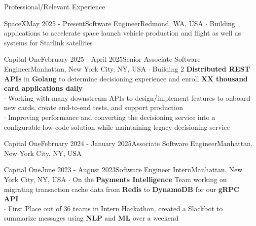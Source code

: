 \documentclass[UTF8]{resume} %
\begin{document}
\begin{rSection}{Professional/Relevant Experience}
    \begin{rSubsection}{SpaceX}{May 2025 - Present}{Software Engineer}{Redmond, WA, USA}
        $\cdot$ Building applications to accelerate space launch vehicle production and flight as well as systems for Starlink satellites
     \end{rSubsection}
\begin{rSubsection}{Capital One}{February 2025 - April 2025}{Senior Associate Software Engineer}{Manhattan, New York City, NY, USA}
   $\cdot$ Building 2 \textbf{Distributed REST APIs} in \textbf{Golang} to determine decisioning experience and enroll \textbf{XX thousand card applications daily} \\
   $\cdot$ Working with many downstream APIs to design/implement features to onboard new cards, create end-to-end tests, and support production \\ 
   $\cdot$ Improving performance and converting the decisioning service into a configurable low-code solution while maintaining legacy decisioning service
\end{rSubsection}
\begin{rSubsection}{Capital One}{February 2024 - January 2025}{Associate Software Engineer}{Manhattan, New York City, NY, USA}
\end{rSubsection}
\begin{rSubsection}{Capital One}{June 2023 - August 2023}{Software Engineer Intern}{Manhattan, New York City, NY, USA}
    $\cdot$ On the \textbf{Payments Intelligence} Team working on migrating transaction cache data from \textbf{Redis} to \textbf{DynamoDB} for our \textbf{gRPC API}\\
    $\cdot$ First Place out of 36 teams in Intern Hackathon, created a Slackbot to summarize messages using \textbf{NLP} and \textbf{ML} over a weekend
\end{rSubsection}

\end{rSection}
\end{document}
